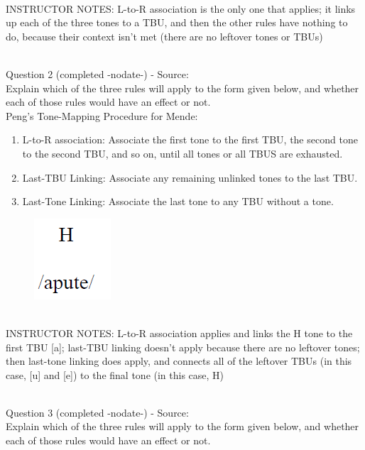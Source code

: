\documentclass[12pt]{article}
\begin{document}
~\\
INSTRUCTOR NOTES: L-to-R association is the only one that applies; it links up each of the three tones to a TBU, and then the other rules have nothing to do, because their context isn't met (there are no leftover tones or TBUs)


~\\

{\large Question 2} (completed -nodate-) - Source: \\

Explain which of the three rules will apply to the form given below, and whether each of those rules would have an effect or not.\\

Peng’s Tone-Mapping Procedure for Mende: \begin{enumerate} \item L-to-R association: Associate the first tone to the first TBU, the second tone to the second TBU, and so on, until all tones or all TBUS are exhausted. \item Last-TBU Linking: Associate any remaining unlinked tones to the last TBU. \item Last-Tone Linking: Associate the last tone to any TBU without a tone. \end{enumerate}

\begin{figure}[H]
\includegraphics{../images/mendetone_b.png}
\end{figure}

~\\
INSTRUCTOR NOTES: L-to-R association applies and links the H tone to the first TBU [a]; last-TBU linking doesn't apply because there are no leftover tones; then last-tone linking does apply, and connects all of the leftover TBUs (in this case, [u] and [e]) to the final tone (in this case, H)


~\\

{\large Question 3} (completed -nodate-) - Source: \\

Explain which of the three rules will apply to the form given below, and whether each of those rules would have an effect or not.\\
\end{document}
